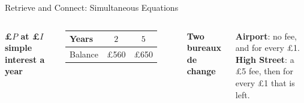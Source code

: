 \documentclass{beamer}
\newcommand{\receipt}[4]{%
  \draw[fill=yellow!4, draw=black!60]
    (#1,0) -- ({#1+1.95},0) -- ({#1+1.95},-1.3)
    \foreach \i in {1,...,6} { -- ({#1+1.95-0.325*\i+0.1625},-1.38) -- ({#1+1.95-0.325*\i},-1.3) }
    -- cycle;
  \node[anchor=west] at ({#1+0.1},-0.25) {#2};
  \node[anchor=west] at ({#1+0.1},-0.58) {#3};
  \draw[black!50, dashed] ({#1+0.1},-0.8) -- ({#1+1.85},-0.8);
  \node[anchor=west, font=\scriptsize\bfseries] at ({#1+0.1},-1.05) {Total};
  \node[anchor=east] at ({#1+1.85},-1.05) {#4};
}
\begin{document}
\begin{frame}[t]{Retrieve and Connect: Simultaneous Equations}
\hypertarget{q-st6}{}
\begin{columns}[T,onlytextwidth]

\vspace{-0.4em}

\vspace{0.8em}
{\scriptsize\bfseries \pounds$P$ at \pounds$I$ simple interest a year}\par
\vspace{0.2em}
{\scriptsize
\renewcommand{\arraystretch}{1.3}
\begin{tabular}{l|c|c}
  Years   & $2$        & $5$\\ \hline
  Balance & \pounds560 & \pounds650
\end{tabular}}

\vspace{0.9em}
{\scriptsize\bfseries Two bureaux de change}\par
\vspace{0.2em}
\parbox{\linewidth}{\raggedright\scriptsize
  \textbf{Airport}: no fee, and  for every \pounds1.\\[2pt]
  \textbf{High Street}: a \pounds5 fee, then  for every \pounds1 that is left.}


\end{columns}
\end{frame}
\end{document}
